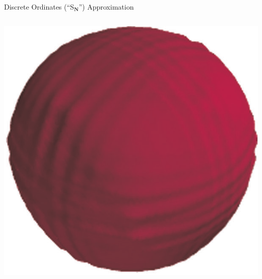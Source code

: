 \documentclass{beamer}
\begin{document}
\begin{frame}{Discrete Ordinates (``S$_\mathbf{N}$'') Approximation}
\begin{columns}
\begin{column}{0.4\textwidth}
\includegraphics[width=\textwidth,natwidth=599,natheight=588]{img/ray-effects-fine.png}
\end{column}
\end{columns}
%
\end{frame}
\end{document}

